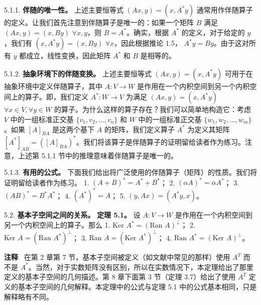 5.1.1. \textbf{伴随的唯一性。} 上述主要恒等式 $(Ax, y) = (x, A^*y)$ 通常用作伴随算子的定义。让我们首先注意到伴随算子是唯一的：如果一个矩阵 $B$ 满足 $(Ax, y) = (x, By)$ $\forall x, y$，则 $B = A^*$。确实，根据 $A^*$ 的定义，对于给定的 $y$，我们有 $(x, A^*y) = (x, By)$ $\forall x$，因此根据推论 1.5， $A^*y = By$。由于这对所有 $y$ 都成立，线性变换，因此矩阵 $A^*$ 和 $B$ 是相等的。




5.1.2. \textbf{抽象环境下的伴随变换。} 上述主要恒等式 $(Ax, y) = (x, A^*y)$ 可用于在抽象环境中定义伴随算子，其中 $A: V \to W$ 是作用在一个内积空间到另一个内积空间上的算子。即，我们定义 $A^*: W \to V$ 为满足 $(Ax, y) = (x, A^*y)$ $\forall x \in V, \forall y \in W$ 的算子。为什么这样的算子存在？我们可以简单地构造它：考虑 $V$ 中的一组标准正交基 $\{v_1, v_2, \dots, v_n\}$ 和 $W$ 中的一组标准正交基 $\{w_1, w_2, \dots, w_m\}$。如果 $[A]_{BA}$ 是这两个基下 $A$ 的矩阵，我们定义算子 $A^*$ 为定义其矩阵 $[A^*]_{AB} = ([A]_{BA})^*$。我们将该算子是伴随算子的证明留给读者作为练习。注意，上述第 5.1.1 节中的推理意味着伴随算子是唯一的。

5.1.3. \textbf{有用的公式。} 下面我们给出将广泛使用的伴随算子（矩阵）的性质。我们将证明留给读者作为练习。
1. $(A + B)^* = A^* + B^*$；
2. $(\alpha A)^* = \bar{\alpha} A^*$；
3. $(AB)^* = B^*A^*$；
4. $(A^*)^* = A$；
5. $(y, Ax) = (A^*y, x)$。

5.2. \textbf{基本子空间之间的关系。}
\textbf{定理 5.1。} 设 $A: V \to W$ 是作用在一个内积空间到另一个内积空间上的算子。那么
1. $\text{Ker } A^* = (\text{Ran } A)^\perp$；
2. $\text{Ker } A = (\text{Ran } A^*)^\perp$；
3. $\text{Ran } A = (\text{Ker } A^*)^\perp$；
4. $\text{Ran } A^* = (\text{Ker } A)^\perp$。

\textbf{注释} ~在第 2 章第 7 节，基本子空间被定义（如文献中常见的那样）使用 $A^T$ 而不是 $A^*$。当然，对于实数矩阵没有区别，所以在实数情况下，本定理给出了那里定义的基本子空间的几何描述。第 8 章下面第 3 节（定理 3.7）给出了使用 $A^T$ 定义的基本子空间的几何解释。本定理中的公式与定理 5.1 中的公式基本相同，只是解释略有不同。

